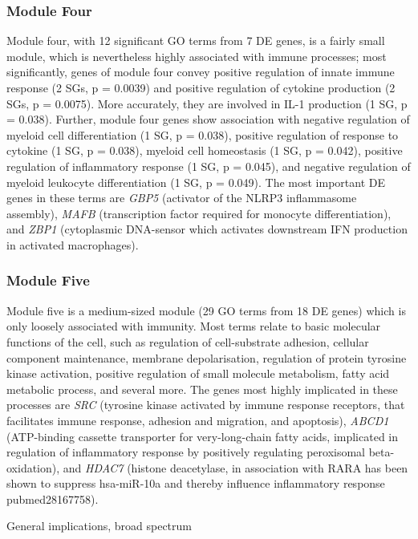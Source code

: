 \subsubsection{Module Four}
Module four, with 12 significant GO terms from 7 DE genes, is a fairly small module, which is nevertheless highly associated with immune processes; most significantly, genes of module four convey positive regulation of innate immune response (2 SGs, p = 0.0039) and positive regulation of cytokine production (2 SGs, p = 0.0075). More accurately, they are involved in IL-1 production (1 SG, p = 0.038). Further, module four genes show association with negative regulation of myeloid cell differentiation (1 SG, p = 0.038), positive regulation of response to cytokine (1 SG, p = 0.038), myeloid cell homeostasis (1 SG, p = 0.042), positive regulation of inflammatory response (1 SG, p = 0.045), and negative regulation of myeloid leukocyte differentiation (1 SG, p = 0.049). The most important DE genes in these terms are \emph{GBP5} (activator of the NLRP3 inflammasome assembly), \emph{MAFB} (transcription factor required for monocyte differentiation), and \emph{ZBP1} (cytoplasmic DNA-sensor which activates downstream IFN production in activated macrophages). 
 


\subsubsection{Module Five}
Module five is a medium-sized module (29 GO terms from 18 DE genes) which is only loosely associated with immunity. Most terms relate to basic molecular functions of the cell, such as regulation of cell-substrate adhesion, cellular component maintenance, membrane depolarisation, regulation of protein tyrosine kinase activation, positive regulation of small molecule metabolism, fatty acid metabolic process, and several more. The genes most highly implicated in these processes are \emph{SRC} (tyrosine kinase activated by immune response receptors, that facilitates immune response, adhesion and migration, and apoptosis), \emph{ABCD1} (ATP-binding cassette transporter for very-long-chain fatty acids, implicated in regulation of inflammatory response by positively regulating peroxisomal beta-oxidation), and \emph{HDAC7} (histone deacetylase, in association with RARA has been shown to suppress hsa-miR-10a and thereby influence inflammatory response pubmed28167758).
 
General implications, broad spectrum

